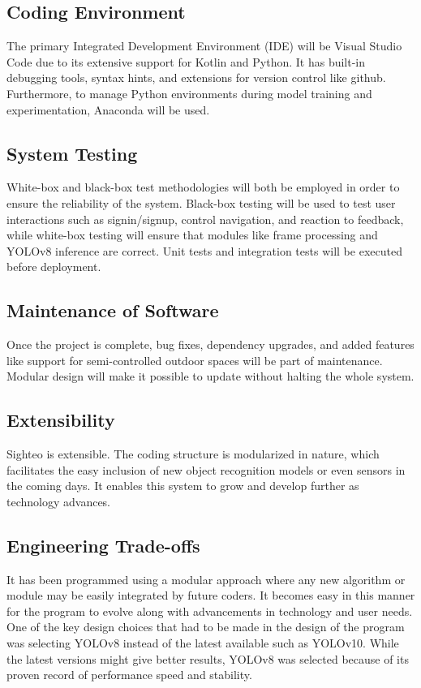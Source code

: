 \documentclass{FastFyp}
\begin{document}
\subsection{Coding Environment}
The primary Integrated Development Environment (IDE) will be Visual Studio Code due to its extensive support for Kotlin and Python. It has built-in debugging tools, syntax hints, and extensions for version control like github. Furthermore, to manage Python environments during model training and experimentation, Anaconda will be used.  

\subsection{System Testing}
White-box and black-box test methodologies will both be employed in order to ensure the reliability of the system. Black-box testing will be used to test user interactions such as signin/signup, control navigation, and reaction to feedback, while white-box testing will ensure that modules like frame processing and YOLOv8 inference are correct. Unit tests and integration tests will be executed before deployment.

\subsection{Maintenance of Software}
Once the project is complete, bug fixes, dependency upgrades, and added features like support for semi-controlled outdoor spaces will be part of maintenance. Modular design will make it possible to update without halting the whole system.

\subsection{Extensibility}
Sighteo is extensible. The coding structure is modularized in nature, which facilitates the easy inclusion of new object recognition models or even sensors in the coming days. It enables this system to grow and develop further as technology advances.

\subsection{Engineering Trade-offs}
It has been programmed using a modular approach where any new algorithm or module may be easily integrated by future coders. It becomes easy in this manner for the program to evolve along with advancements in technology and user needs. One of the key design choices that had to be made in the design of the program was selecting YOLOv8 instead of the latest available such as YOLOv10. While the latest versions might give better results, YOLOv8 was selected because of its proven record of performance speed and stability.
\end{document}

